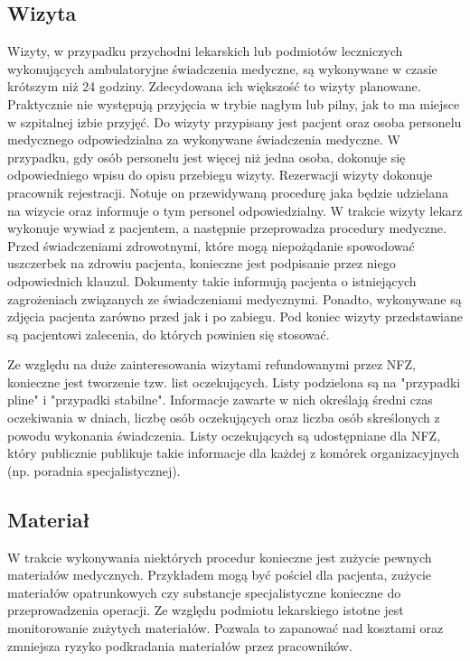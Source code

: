 \subsection{Wizyta}
\label{subsec:wizyta}
Wizyty, w przypadku przychodni lekarskich lub podmiotów leczniczych wykonujących ambulatoryjne świadczenia medyczne, są wykonywane w czasie krótszym niż 24 godziny. Zdecydowana ich większość to wizyty planowane. Praktycznie nie występują przyjęcia w trybie nagłym lub pilny, jak to ma miejsce w szpitalnej izbie przyjęć. Do wizyty przypisany jest pacjent oraz osoba personelu medycznego odpowiedzialna za wykonywane świadczenia medyczne. W przypadku, gdy osób personelu jest więcej niż jedna osoba, dokonuje się odpowiedniego wpisu do opisu przebiegu wizyty.
Rezerwacji wizyty dokonuje pracownik rejestracji. Notuje on przewidywaną procedurę jaka będzie udzielana na wizycie oraz informuje o tym personel odpowiedzialny. W trakcie wizyty lekarz wykonuje wywiad z pacjentem, a następnie przeprowadza procedury medyczne. Przed świadczeniami zdrowotnymi, które mogą niepożądanie spowodować uszczerbek na zdrowiu pacjenta, konieczne jest podpisanie przez niego odpowiednich klauzul. Dokumenty takie informują pacjenta o istniejących zagrożeniach związanych ze świadczeniami medycznymi. Ponadto, wykonywane są zdjęcia pacjenta zarówno przed jak i po zabiegu. Pod koniec wizyty przedstawiane są pacjentowi zalecenia, do których powinien się stosować. 

Ze względu na duże zainteresowania wizytami refundowanymi przez NFZ, konieczne jest tworzenie tzw. list oczekujących. Listy podzielona są na "przypadki pline" i "przypadki stabilne". Informacje zawarte w nich określają średni czas oczekiwania w dniach, liczbę osób oczekujących oraz liczba osób skreślonych z powodu wykonania świadczenia. Listy oczekujących są udostępniane dla NFZ, który publicznie publikuje takie informacje dla każdej z komórek organizacyjnych (np. poradnia specjalistycznej).

\subsection{Materiał}
\label{subsec:material}
W trakcie wykonywania niektórych procedur konieczne jest zużycie pewnych materiałów medycznych. Przykładem mogą być pościel dla pacjenta, zużycie materiałów opatrunkowych czy substancje specjalistyczne konieczne do przeprowadzenia operacji. Ze względu podmiotu lekarskiego istotne jest monitorowanie zużytych materiałów. Pozwala to zapanować nad kosztami oraz zmniejsza ryzyko podkradania materiałów przez pracowników.

